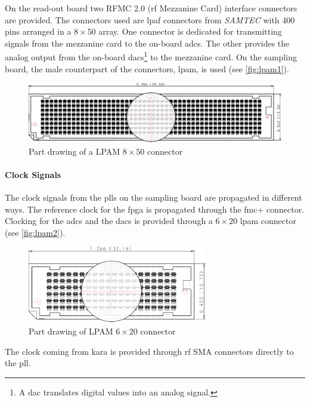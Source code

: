 On the read-out board two RFMC 2.0 (\gls{rf} Mezzanine Card) interface connectors are provided.
The connectors used are \gls{lpaf} connectors from \textit{SAMTEC} with 400 pins arranged in a $8\times50$ array.
One connector is dedicated for transmitting signals from the mezzanine card to the on-board \glspl{adc}.
The other provides the analog output from the on-board \glspl{dac}\footnote{A \gls{dac} translates digital values into an analog signal.} to the mezzanine card.
On the sampling board, the male counterpart of the connectors, \gls{lpam}, is used (see \autoref{fig:lpam1}).

\begin{figure}[tbh]
	\centering
	\includegraphics[width = \textwidth]{chap/04-work/img/lpam_50_top.pdf}
	\caption[LPAM $8\times50$ connector]{Part drawing of a LPAM $8\times50$ connector}
	\label{fig:lpam1}
\end{figure}


\paragraph{Clock Signals}
The clock signals from the \glspl{pll} on the sampling board are propagated in different ways.
The reference clock for the \gls{fpga} is propagated through the \gls{fmc}+ connector.
Clocking for the \glspl{adc} and the \glspl{dac} is provided through a $6\times20$ \gls{lpam} connector (see \autoref{fig:lpam2}).
\begin{figure}[tbh]
	\centering
	\includegraphics[width = 0.7\textwidth]{chap/04-work/img/lpam_20.pdf}
	\caption[LPAM $6\times20$ connector]{Part drawing of LPAM $6\times20$ connector}
	\label{fig:lpam2}
\end{figure}

The clock coming from \gls{kara} is provided through \gls{rf} SMA connectors directly to the \gls{pll}.

